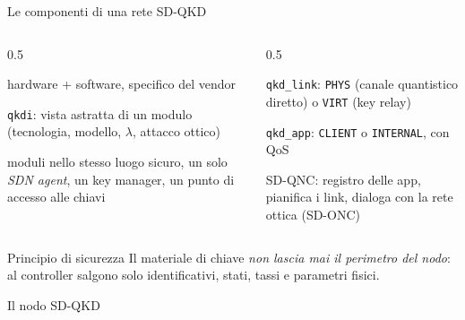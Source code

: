 \documentclass[10pt]{beamer}
\begin{document}
\begin{frame}{Le componenti di una rete SD-QKD}
  \small
  \begin{columns}[T]
    \begin{column}{0.5\textwidth}
      \begin{description}
        \item[Modulo QKD] hardware + software, specifico del vendor
        \item[Interfaccia QKD] \texttt{qkdi}: vista astratta di un modulo
              (tecnologia, modello, $\lambda$, attacco ottico)
        \item[Nodo SD-QKD] moduli nello stesso luogo sicuro, un solo
              \emph{SDN agent}, un key manager, un punto di accesso alle chiavi
      \end{description}
    \end{column}
    \begin{column}{0.5\textwidth}
      \begin{description}[Applicazione]
        \item[Link] \texttt{qkd\_link}: \texttt{PHYS} (canale quantistico
              diretto) o \texttt{VIRT} (key relay)
        \item[Applicazione] \texttt{qkd\_app}: \texttt{CLIENT} o
              \texttt{INTERNAL}, con QoS
        \item[Controller] SD-QNC: registro delle app, pianifica i link,
              dialoga con la rete ottica (SD-ONC)
      \end{description}
    \end{column}
  \end{columns}
  \vspace{1ex}
  \begin{alertblock}{Principio di sicurezza}
    Il materiale di chiave \emph{non lascia mai il perimetro del nodo}: al
    controller salgono solo identificativi, stati, tassi e parametri fisici.
  \end{alertblock}
\end{frame}

\begin{frame}{Il nodo SD-QKD}
\end{frame}
\end{document}
